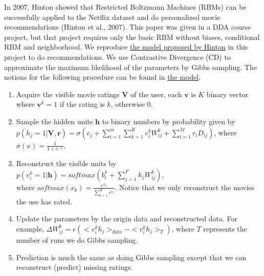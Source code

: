 \begin{CJK*}{UTF8}{gbsn}
In 2007, Hinton showed that Restricted Boltzmann Machines (RBMs) can be successfully applied to the Netflix dataset and do personalized movie recommendations (Hinton et al., 2007). This paper was given in a DDA course project, but that project requires only the basic RBM without biases, conditional RBM and neighborhood. We reproduce \hyperref[RBM]{the model proposed by Hinton} in this project to do recommendations. We use Contrastive Divergence (CD) to approximate the maximum likelihood of the parameters by Gibbs sampling. The notions for the following procedure can be found in \href{rbm}{the model}.
\begin{enumerate}
    \item Acquire the visible movie ratings $ \bm{V} $ of the user, each $ \bm{v} $ is $ K $ binary vector where $ \bm{v}^k = 1 $ if the rating is $ k $, otherwise 0.
    \item Sample the hidden units $ \bm{h} $ to binary numbers by probability given by \\ $ p(h_j = 1 | \bm{V}, \bm{r}) = \sigma(c_j + \sum_{i = 1}^m \sum_{k = 1}^K v_i^k W_{ij}^k + \sum_{i = 1}^M r_i D_{ij}) $, where $ \sigma(x) = \frac{1}{1 + e^{-x}}  $.
    \item Reconstruct the visible units by $ p(v_i^k = 1 | \bm{h}) = softmax(b_i^k + \sum_{j = 1}^F h_j W_{ij}^k) $, \\where $ softmax(x_k) = \frac{e^{x_k}}{\sum_{l= 1}^K e^{x_l}} $. Notice that we only reconstruct the movies the use has rated.
    \item Update the parameters by the origin data and reconstructed data. For example, $ \Delta W_{ij}^k = \epsilon (<v_i^k h_j>_{data} - <v_i^k h_j>_T) $, where $ T $ represents the number of runs we do Gibbs sampling.
    \item Prediction is much the same as doing Gibbs sampling except that we can reconstruct (predict) missing ratings.
\end{enumerate}


\end{CJK*}
